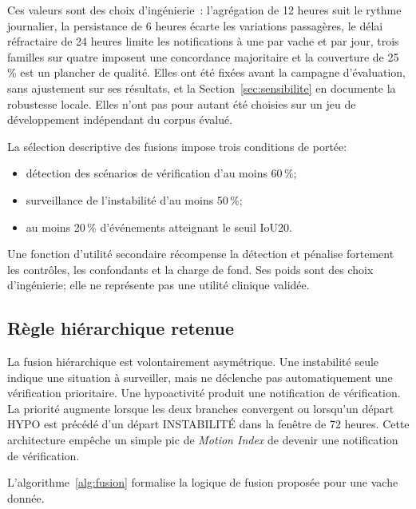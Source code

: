 Ces valeurs sont des choix d'ingénierie~: l'agrégation de 12 heures suit le rythme journalier,
la persistance de 6 heures écarte les variations passagères, le délai réfractaire de 24 heures
limite les notifications à une par vache et par jour, trois familles sur quatre imposent une
concordance majoritaire et la couverture de 25\,\% est un plancher de qualité. Elles ont été
fixées avant la campagne d'évaluation, sans ajustement sur ses résultats, et la
Section~\ref{sec:sensibilite} en documente la robustesse locale. Elles n'ont pas pour autant
été choisies sur un jeu de développement indépendant du corpus évalué.

La sélection descriptive des fusions impose trois conditions de portée:
\begin{itemize}
  \item détection des scénarios de vérification d'au moins 60\,\%;
  \item surveillance de l'instabilité d'au moins 50\,\%;
  \item au moins 20\,\% d'événements atteignant le seuil IoU20.
\end{itemize}
Une fonction d'utilité secondaire récompense la détection et
pénalise fortement les contrôles, les confondants et la charge de fond. Ses poids sont des
choix d'ingénierie; elle ne représente pas une utilité clinique validée.

\subsection{Règle hiérarchique retenue}
La fusion hiérarchique est volontairement asymétrique. Une instabilité seule indique une
situation à surveiller, mais ne déclenche pas automatiquement une vérification prioritaire.
Une hypoactivité produit une notification de vérification. La priorité augmente lorsque les deux
branches convergent ou lorsqu'un départ HYPO est précédé d'un départ INSTABILITÉ dans la
fenêtre de 72 heures. Cette architecture empêche un simple pic de \textit{Motion Index} de
devenir une notification de vérification.

L'algorithme~\ref{alg:fusion} formalise la logique de fusion proposée pour une vache donnée.

